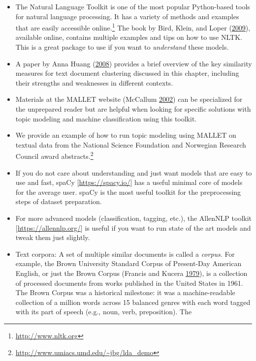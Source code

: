 \documentclass[]{krantz}
\begin{document}
\begin{itemize}
\item
  The Natural Language Toolkit is one of the most popular Python-based
  tools for natural language processing. It has a variety of methods and
  examples that are easily accessible online.\footnote{\url{http://www.nltk.org}}
  The book by Bird, Klein, and Loper
  (\protect\hyperlink{ref-bird-09}{2009}), available online, contains
  multiple examples and tips on how to use NLTK. This is a great package
  to use if you want to \emph{understand} these models.
\item
  A paper by Anna Huang (\protect\hyperlink{ref-huang-08}{2008})
  provides a brief overview of the key similarity measures for text
  document clustering discussed in this chapter, including their
  strengths and weaknesses in different contexts.
\item
  Materials at the MALLET website (McCallum
  \protect\hyperlink{ref-mallet}{2002}) can be specialized for the
  unprepared reader but are helpful when looking for specific solutions
  with topic modeling and machine classification using this toolkit.
\item
  We provide an example of how to run topic modeling using MALLET on
  textual data from the National Science Foundation and Norwegian
  Research Council award abstracts.\footnote{\url{http://www.umiacs.umd.edu/~jbg/lda_demo}}
\item
  If you do not care about understanding and just want models that are
  easy to use and fast, spaCy {[}\url{https://spacy.io/}{]} has a useful
  minimal core of models for the average user. spaCy is the most useful
  toolkit for the preprocessing steps of dataset preparation.
\item
  For more advanced models (classification, tagging, etc.), the AllenNLP
  toolkit {[}\url{https://allennlp.org/}{]} is useful if you want to run
  state of the art models and tweak them just slightly.
\item
  Text corpora: A set of multiple similar documents is called a
  \emph{corpus}. For\\
  example, the Brown University Standard Corpus of Present-Day American
  English, or just the Brown Corpus (Francis and Kucera
  \protect\hyperlink{ref-browncorpus}{1979}), is a collection of
  processed documents from works published in the United States in 1961.
  The Brown Corpus was a historical milestone: it was a machine-readable
  collection of a million words across 15 balanced genres with each word
  tagged with its part of speech (e.g., noun, verb, preposition). The

\end{itemize}
\end{document}
